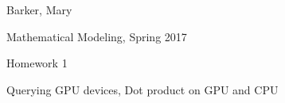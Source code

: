\documentclass{article}
\def \hwnum{1}
\def \hwdescription{Querying GPU devices, Dot product on GPU and CPU}
\begin{document}
{\color{white}{thing}}
\begin{center}
{
	\fontsize{20pt}{20pt}\selectfont
	Barker, Mary
}

\vspace{1cm}

{
	\fontsize{20pt}{20pt}\selectfont
	Mathematical Modeling, Spring 2017
}

\vspace{1cm}

{
	\fontsize{20pt}{20pt}\selectfont
	Homework \hwnum
}

\vspace{1cm}

{
	\fontsize{20pt}{20pt}\selectfont
	\hwdescription
}

\end{center}
\pagebreak

\pagebreak

\pagebreak

\end{document}
